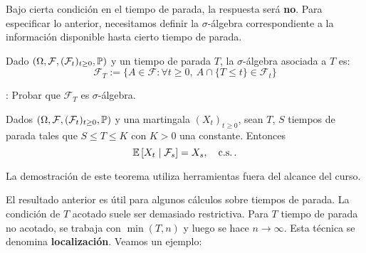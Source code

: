 \newp Bajo cierta condición en el tiempo de parada, la respuesta será \textbf{no}. Para especificar lo anterior, 
necesitamos definir la $\sigma$-álgebra correspondiente a la información disponible hasta cierto 
tiempo de parada. 
\begin{definition}
Dado $(\Omega, \mathcal{F}, (\mathcal{F}_t)_{t \geq 0}, \P)$ y un tiempo de parada $T$, la 
$\sigma$-álgebra asociada a $T$ es:
\begin{equation*}
        \mathcal{F}_T := \{ A \in \mathcal{F}: \forall t \geq 0, ~ A \cap
        \{T\leq t\} \in \mathcal{F}_t \}
\end{equation*}
\end{definition}
\ejercicio  \gris : Probar que $\mathcal{F}_T$ es $\sigma$-álgebra. \negro

\begin{theorem}
Dados $(\Omega, \mathcal{F}, (\mathcal{F}_t)_{t \geq 0}, \P)$ y una martingala $(X_t)_{t \geq 0}$, 
sean $T$, $S$ tiempos de parada tales que $S \leq T \le K$ con $K>0$ una constante. Entonces 
\begin{equation*}
        \E \left[ X_t \mid  \mathcal{F}_s \right]  = X_s,  ~ ~ ~ \text{c.s.}\,.
\end{equation*}
\end{theorem}
La demostración de este teorema utiliza herramientas fuera del alcance del curso. 

\newp El resultado anterior es útil para algunos cálculos sobre tiempos de parada. La condición de $T$ acotado suele ser demasiado restrictiva. Para $T$ tiempo de parada no acotado, se trabaja con $\min(T,n)$ y luego se hace $n \to \infty$. Esta técnica se denomina \textbf{localización}. Veamos un ejemplo:

